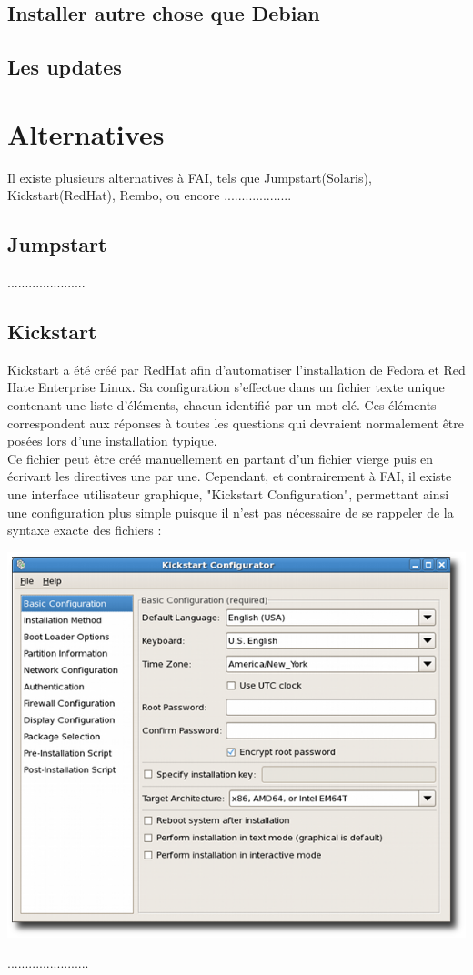 \documentclass[a4paper,12pt,one side,titlepage]{report}
\begin{document}
\section{Installer autre chose que Debian}

\section{Les updates}

\chapter{Alternatives}
Il existe plusieurs alternatives à FAI, tels que Jumpstart(Solaris), Kickstart(RedHat), Rembo, ou encore ...................

\section{Jumpstart}
......................

\section{Kickstart}
Kickstart a été créé par RedHat afin d'automatiser l'installation de Fedora et Red Hate Enterprise Linux. Sa configuration s'effectue dans un fichier texte unique contenant une liste d'éléments, chacun identifié par un mot-clé. Ces éléments correspondent aux réponses à toutes les questions qui devraient normalement être posées lors d'une installation typique.\\
Ce fichier peut être créé manuellement en partant d'un fichier vierge puis en écrivant les directives une par une.
Cependant, et contrairement à FAI, il existe une interface utilisateur graphique, "Kickstart Configuration", permettant ainsi une configuration plus simple puisque il n'est pas nécessaire de se rappeler de la syntaxe exacte des fichiers :\\
\begin{center}\includegraphics[scale=0.5]{./img/kickstart.png}\end{center}
.......................
\end{document}
